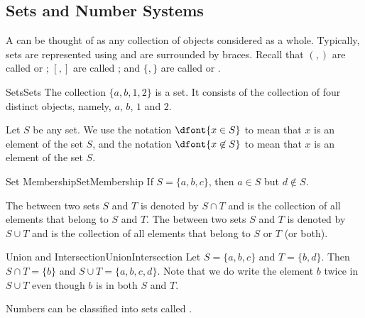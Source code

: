 \subsection{Sets and Number Systems}

A  can be thought of as any collection of  objects 
considered as a whole. Typically, sets are represented using 
 and are surrounded by braces.
Recall that $(,)$ are called  or ;
$[,]$ are called ; and $\{,\}$ are called  or . \\

\begin{example}{Sets}{Sets}
The collection $\{a,b,1,2\}$ is a set. It consists of the collection of
four distinct objects, namely, $a$, $b$, $1$ and $2$.
\end{example}

Let $S$ be any set. We use the notation $\dfont{x\in S}$ to mean that $x$ 
is an element  of the set $S$, and the notation $\dfont{x\not\in S}$ to mean that $x$ is  an element of the set $S$. \\

\begin{example}{Set Membership}{SetMembership}
If $S=\{a,b,c\}$, then $a\in S$ but $d\not\in S$.
\end{example}

The  between two sets $S$ and $T$ is denoted 
by $S\cap T$ and is the collection of all elements that belong to 
 $S$ and $T$. The  between two sets $S$ 
and $T$ is denoted by $S\cup T$ and is the collection of all elements 
that belong to  $S$ or $T$ (or both). \\

\begin{example}{Union and Intersection}{UnionIntersection}
Let $S=\{a,b,c\}$ and $T=\{b,d\}$.
Then $S\cap T=\{b\}$ and $S\cup T=\{a,b,c,d\}$. 
Note that we do  write the element $b$ twice in $S\cup T$ even 
though $b$ is in both $S$ and $T$.
\end{example}

Numbers can be classified into sets called .


